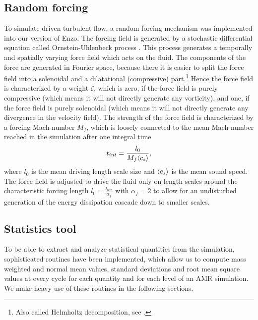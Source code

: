 \subsection{Random forcing}\label{randforce}
To simulate driven turbulent flow, a random forcing mechanism was implemented
into our version of Enzo. The forcing field is generated by a stochastic
differential equation called Ornstein-Uhlenbeck process
\citep{Schmidt2004}. This 
process generates a temporally and spatially varying force field which acts on
the fluid. The components of the force are generated in Fourier space, because
there it is easier to split the force field into a solenoidal and a 
dilatational (compressive) part.\footnote{Also called Helmholtz decomposition,
see \citet{Schmidt2004}.} Hence the force field is characterized by a weight
$\zeta$, which is zero, if the force field is purely compressive (which means it
will not directly generate any vorticity), and one, if the force field
is purely solenoidal (which means it will not directly generate any
divergence in the velocity field). The strength of the force field is
characterized by a forcing 
Mach number $M_f$, which is loosely connected to the mean Mach number reached 
in the simulation after one integral time
\begin{align}
t_{int}=\frac{l_0}{M_f \langle c_s \rangle},
\end{align}
where $l_0$ is the mean driving length scale size and
$\langle c_s \rangle$ is the mean sound speed. The force field is adjusted to drive
the fluid only on length scales around the characteristic forcing length $l_0 =
\frac{l_{box}}{\alpha_f}$ with $\alpha_f =2 $ to allow for an
undisturbed generation of the energy dissipation cascade down to smaller
scales. 

\subsection{Statistics tool}
To be able to extract and analyze statistical quantities from the simulation,
sophisticated routines have been implemented, which allow us to compute 
mass weighted and normal mean values, standard deviations and root mean square
values at every cycle for each quantity and for each level of an AMR simulation.
We make heavy use of these routines in the following sections. 

